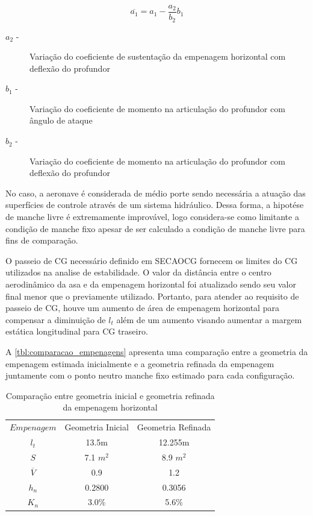 \begin{equation}
\overline{a_1} =  a_1 - \frac{a_2}{b_2} b_1
\end{equation}

\begin{description}
\item[$a_2$ -] Variação do coeficiente de sustentação da empenagem horizontal com deflexão do profundor
\item[$b_1$ -] Variação do coeficiente de momento na articulação do profundor com ângulo de ataque
\item[$b_2$ -] Variação do coeficiente de momento na articulação do profundor com deflexão do profundor
\end{description}

No caso, a aeronave é considerada de médio porte sendo necessária a atuação das superfícies de controle através de um sistema hidráulico. Dessa forma, a hipotése de manche livre é extremamente improvável, logo considera-se como limitante a condição de manche fixo apesar de ser calculado a condição de manche livre para fins de comparação.

O passeio de CG necessário definido em SECAOCG fornecem os limites do CG utilizados na analise de estabilidade. O valor da distância entre o centro aerodinâmico da asa e da empenagem horizontal foi atualizado sendo seu valor final menor que o previamente utilizado. Portanto, para atender ao requisito de passeio de CG, houve um aumento de área de empenagem horizontal para compensar a diminuição de $l_t$ além de um aumento visando aumentar a margem estática longitudinal para CG traseiro.

A \autoref{tbl:comparacao_empenagens} apresenta uma comparação entre a geometria da empenagem estimada inicialmente e a geometria refinada da empenagem juntamente com o ponto neutro manche fixo estimado para cada configuração.

\begin{table}[H]
\centering
\begin{tabular}{ccc}
\toprule
$ Empenagem $ & Geometria Inicial & Geometria Refinada \\
$ l_t $ & 13.5m & 12.255m \\
$ S $ & 7.1 $m^2$ & 8.9 $m^2$ \\
$ \overline{V} $ & 0.9 & 1.2 \\
$ h_n $ & 0.2800 & 0.3056 \\
$ K_n $ & 3.0\% & 5.6\% \\
\bottomrule
\end{tabular}
\caption[Comparação entre geometria inicial e geometria refinada da empenagem horizontal]{Comparação entre geometria inicial e geometria refinada da empenagem horizontal}
\label{tbl:comparacao_empenagens}
\end{table}

